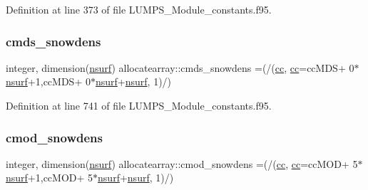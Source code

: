 Definition at line 373 of file L\+U\+M\+P\+S\+\_\+\+Module\+\_\+constants.\+f95.

\mbox{\label{namespaceallocatearray_a6fba2ffdba3b558c1dc85a829631f700}} 
\subsubsection{\texorpdfstring{cmds\+\_\+snowdens}{cmds\_snowdens}}
{\footnotesize\ttfamily integer, dimension(\hyperlink{namespaceallocatearray_acd22f92a06f7e9a2a91426b3dc99fdb0}{nsurf}) allocatearray\+::cmds\+\_\+snowdens =(/(\hyperlink{namespaceallocatearray_ac863c81704eb507dee10f5e10741e10c}{cc}, \hyperlink{namespaceallocatearray_ac863c81704eb507dee10f5e10741e10c}{cc}=cc\+M\+DS+ 0$\ast$\hyperlink{namespaceallocatearray_acd22f92a06f7e9a2a91426b3dc99fdb0}{nsurf}+1,cc\+M\+DS+ 0$\ast$\hyperlink{namespaceallocatearray_acd22f92a06f7e9a2a91426b3dc99fdb0}{nsurf}+\hyperlink{namespaceallocatearray_acd22f92a06f7e9a2a91426b3dc99fdb0}{nsurf}, 1)/)}



Definition at line 741 of file L\+U\+M\+P\+S\+\_\+\+Module\+\_\+constants.\+f95.

\mbox{\label{namespaceallocatearray_a8c1534662d6320cff6200cb5f241b500}} 
\subsubsection{\texorpdfstring{cmod\+\_\+snowdens}{cmod\_snowdens}}
{\footnotesize\ttfamily integer, dimension(\hyperlink{namespaceallocatearray_acd22f92a06f7e9a2a91426b3dc99fdb0}{nsurf}) allocatearray\+::cmod\+\_\+snowdens =(/(\hyperlink{namespaceallocatearray_ac863c81704eb507dee10f5e10741e10c}{cc}, \hyperlink{namespaceallocatearray_ac863c81704eb507dee10f5e10741e10c}{cc}=cc\+M\+OD+ 5$\ast$\hyperlink{namespaceallocatearray_acd22f92a06f7e9a2a91426b3dc99fdb0}{nsurf}+1,cc\+M\+OD+ 5$\ast$\hyperlink{namespaceallocatearray_acd22f92a06f7e9a2a91426b3dc99fdb0}{nsurf}+\hyperlink{namespaceallocatearray_acd22f92a06f7e9a2a91426b3dc99fdb0}{nsurf}, 1)/)}



